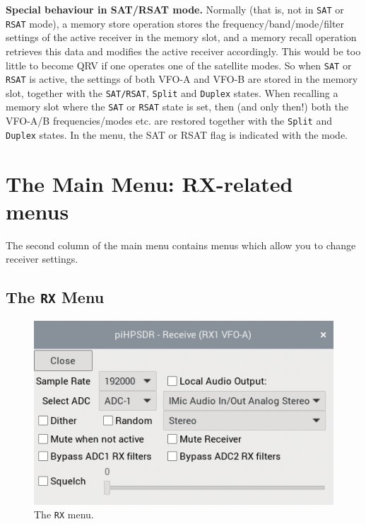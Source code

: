 \documentclass[12pt]{book}
\def\bltt#1{\texttt{\color{blue}#1}}
\begin{document}
\textbf{Special behaviour in SAT/RSAT mode.} Normally (that is, not in \bltt{SAT} or \bltt{RSAT} mode), a memory store
operation stores the frequency/band/mode/filter settings of the active receiver in the memory slot,
and a memory recall operation retrieves this data and modifies the active receiver accordingly. This would be
too little to become QRV if one operates one of the satellite  modes. So when \bltt{SAT} or \bltt{RSAT} is
active, the settings of both VFO-A and VFO-B are stored in the memory slot, together with the
\bltt{SAT/RSAT}, \bltt{Split}
and \bltt{Duplex} states. When recalling a memory slot where the \bltt{SAT} or \bltt{RSAT} state is set, then
(and only then!) both
the VFO-A/B frequencies/modes etc. are restored together with the \bltt{Split} and \bltt{Duplex} states. In the menu,
the SAT or RSAT flag is indicated with the mode.
\chapter[RX-related menus]{The Main Menu: RX-related menus}

The second column of the main menu contains menus which allow you to change
receiver settings.

\section{The \texttt{RX} Menu}

\begin{figure}[ht!]
\center
\includegraphics[scale=0.45]{RXMenu.png}
\caption{The \bltt{RX} menu.}
\label{fig:RXMenu}
\end{figure}
\end{document}
